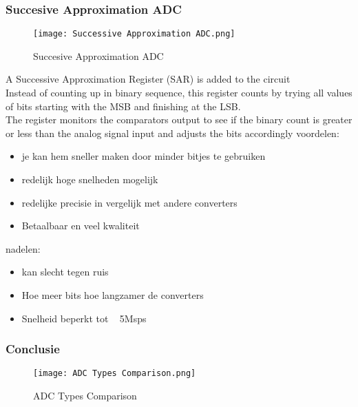 \subsubsection{Succesive Approximation ADC}
\begin{figure}[H]
    \centering
    \texttt{[image: Successive Approximation ADC.png]}
    \caption*{Succesive Approximation ADC}
    \end{figure}
A Successive Approximation Register (SAR) is added to the circuit\\
Instead of counting up in binary sequence, this register counts by trying all values of bits starting with the MSB and finishing at the LSB.\\
The register monitors the comparators output to see if the binary count is greater or less than the analog signal input and adjusts the bits accordingly
voordelen:
\begin{itemize}
    \item je kan hem sneller maken door minder bitjes te gebruiken
    \item redelijk hoge snelheden mogelijk
    \item redelijke precisie in vergelijk met andere converters
    \item Betaalbaar en veel kwaliteit
\end{itemize}
nadelen:
\begin{itemize}
    \item kan slecht tegen ruis
    \item Hoe meer bits hoe langzamer de converters
    \item Snelheid beperkt tot ~ 5Msps
\end{itemize}

\subsubsection{Conclusie}
\begin{figure}[H]
    \centering
    \texttt{[image: ADC Types Comparison.png]}
    \caption*{ADC Types Comparison}
    \end{figure}
    